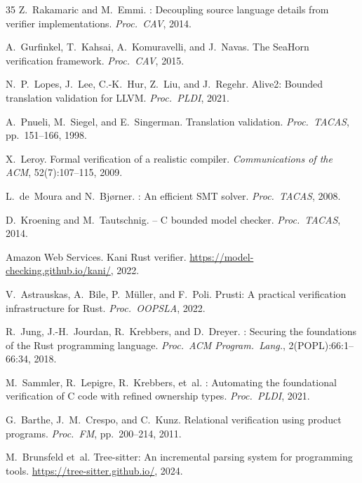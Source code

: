 \documentclass[10pt,a4paper]{article}
\begin{document}
\begin{thebibliography}{35}
Z.~Rakamaric and M.~Emmi.
: Decoupling source language details from verifier implementations.
\newblock \emph{Proc.\ CAV}, 2014.

A.~Gurfinkel, T.~Kahsai, A.~Komuravelli, and J.~Navas.
\newblock The {SeaHorn} verification framework.
\newblock \emph{Proc.\ CAV}, 2015.

N.~P.~Lopes, J.~Lee, C.-K.~Hur, Z.~Liu, and J.~Regehr.
\newblock Alive2: Bounded translation validation for {LLVM}.
\newblock \emph{Proc.\ PLDI}, 2021.

A.~Pnueli, M.~Siegel, and E.~Singerman.
\newblock Translation validation.
\newblock \emph{Proc.\ TACAS}, pp.\ 151--166, 1998.

X.~Leroy.
\newblock Formal verification of a realistic compiler.
\newblock \emph{Communications of the ACM}, 52(7):107--115, 2009.

L.~de~Moura and N.~Bj{\o}rner.
: An efficient {SMT} solver.
\newblock \emph{Proc.\ TACAS}, 2008.

D.~Kroening and M.~Tautschnig.
 -- {C} bounded model checker.
\newblock \emph{Proc.\ TACAS}, 2014.

Amazon Web Services.
\newblock Kani {Rust} verifier.
\newblock \url{https://model-checking.github.io/kani/}, 2022.

V.~Astrauskas, A.~Bi\-le, P.~M\"uller, and F.~Poli.
\newblock Prusti: A practical verification infrastructure for {Rust}.
\newblock \emph{Proc.\ OOPSLA}, 2022.

R.~Jung, J.-H.~Jourdan, R.~Krebbers, and D.~Dreyer.
: Securing the foundations of the {Rust} programming language.
\newblock \emph{Proc.\ ACM Program.\ Lang.}, 2(POPL):66:1--66:34, 2018.

M.~Sammler, R.~Lepigre, R.~Krebbers, et~al.
: Automating the foundational verification of {C} code with refined ownership types.
\newblock \emph{Proc.\ PLDI}, 2021.

G.~Barthe, J.~M.~Crespo, and C.~Kunz.
\newblock Relational verification using product programs.
\newblock \emph{Proc.\ FM}, pp.\ 200--214, 2011.

M.~Brunsfeld et~al.
\newblock Tree-sitter: An incremental parsing system for programming tools.
\newblock \url{https://tree-sitter.github.io/}, 2024.


\end{thebibliography}
\end{document}
